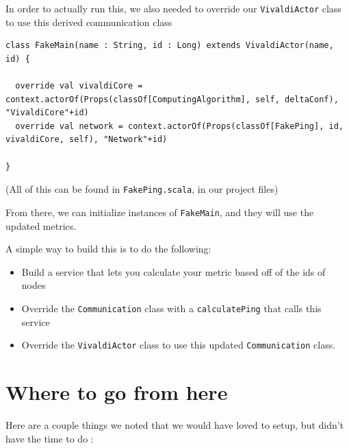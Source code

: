 \documentclass[11pt,a4paper]{article}
\begin{document}
In order to actually run this, we also needed to override our \verb|VivaldiActor| class to use this derived communication class

\begin{verbatim}
class FakeMain(name : String, id : Long) extends VivaldiActor(name, id) {

  override val vivaldiCore = context.actorOf(Props(classOf[ComputingAlgorithm], self, deltaConf), "VivaldiCore"+id)
  override val network = context.actorOf(Props(classOf[FakePing], id, vivaldiCore, self), "Network"+id)

}
\end{verbatim}

(All of this can be found in \verb|FakePing.scala|, in our project files)

From there, we can initialize instances of \verb|FakeMain|, and they will use the updated metrics.

A simple way to build this is to do the following: 
\begin{itemize}
\item Build a service that lets you calculate your metric based off of the ids of nodes 
\item Override the \verb|Communication| class with a \verb|calculatePing| that calls this service
\item Override the \verb|VivaldiActor| class to use this updated \verb|Communication| class.
\end{itemize}

\section{Where to go from here}
 Here are a couple things we noted that we would have loved to setup, but didn't have the time to do :
 
\end{document}
